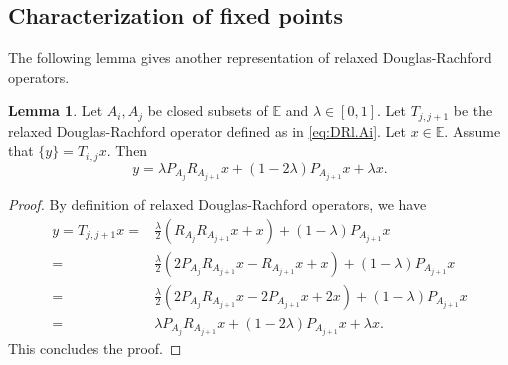 \documentclass[12pt]{article}
\theoremstyle{definition}
\newtheorem{lemma}{Lemma}
\newcommand{\Ebb}{\mathbb{E}}
\begin{document}
\subsection{Characterization of fixed points}\label{sec:characterization.fixed.points}
The following lemma gives another representation of relaxed Douglas-Rachford operators. 
\begin{lemma}\label{lem:Tij.expression}
Let $A_i,A_j$ be closed subsets of $\Ebb$ and $\lambda\in [0,1]$. Let $T_{j,j+1}$ be the relaxed Douglas-Rachford operator defined as in \eqref{eq:DRl.Ai}. Let $x\in\Ebb$. Assume that $\{y\}=T_{i,j}x$. Then
\begin{equation}
    y = \lambda P_{A_j}R_{A_{j+1}}x+(1-2\lambda)P_{A_{j+1}}x+\lambda x.
\end{equation}
\end{lemma}
\begin{proof}
    By definition of relaxed Douglas-Rachford operators, we have 
\begin{equation}
    \begin{array}{rl}
        y=T_{j,j+1}x =&\frac{\lambda}{2}(R_{A_j}R_{A_{j+1}}x+x)+(1-\lambda)P_{A_{j+1}}x  \\
         =& \frac{\lambda}{2}(2P_{A_j}R_{A_{j+1}}x-R_{A_{j+1}}x+x)+(1-\lambda)P_{A_{j+1}}x\\
         =& \frac{\lambda}{2}(2P_{A_j}R_{A_{j+1}}x-2P_{A_{j+1}}x+2x)+(1-\lambda)P_{A_{j+1}}x\\
         =&\lambda P_{A_j}R_{A_{j+1}}x + (1-2\lambda)P_{A_{j+1}}x+\lambda x.
    \end{array}
\end{equation}
 This concludes the proof.
\end{proof}
\end{document}
